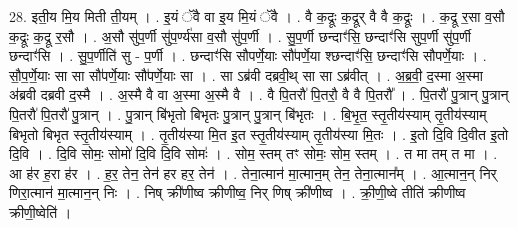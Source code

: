 \documentclass[17pt]{extarticle}
\begin{document}
28. इती॒य मि॒य मिती ती॒यम् । . इ॒यं ॅवै वा इ॒य मि॒यं ॅवै । . वै क॒द्रूः क॒द्रूर् वै वै क॒द्रूः । . क॒द्रू र॒सा व॒सौ क॒द्रूः क॒द्रू र॒सौ । . अ॒सौ सु॑प॒र्णी सु॑प॒र्ण्य॑सा व॒सौ सु॑प॒र्णी । . सु॒प॒र्णी छन्दाꣳ॑सि॒ छन्दाꣳ॑सि सुप॒र्णी सु॑प॒र्णी छन्दाꣳ॑सि । . सु॒प॒र्णीति॑ सु - प॒र्णी । . छन्दाꣳ॑सि सौपर्णे॒याः सौ॑पर्णे॒या श्छन्दाꣳ॑सि॒ छन्दाꣳ॑सि सौपर्णे॒याः । . सौ॒प॒र्णे॒याः सा सा सौ॑पर्णे॒याः सौ॑पर्णे॒याः सा । . सा ऽब्र॑वी दब्रवी॒थ् सा सा ऽब्र॑वीत् । . अ॒ब्र॒वी॒ द॒स्मा अ॒स्मा अ॑ब्रवी दब्रवी द॒स्मै । . अ॒स्मै वै वा अ॒स्मा अ॒स्मै वै । . वै पि॒तरौ॑ पि॒तरौ॒ वै वै पि॒तरौ᳚ । . पि॒तरौ॑ पु॒त्रान् पु॒त्रान् पि॒तरौ॑ पि॒तरौ॑ पु॒त्रान् । . पु॒त्रान् बि॑भृतो बिभृतः पु॒त्रान् पु॒त्रान् बि॑भृतः । . बि॒भृ॒त॒ स्तृ॒तीय॑स्याम् तृ॒तीय॑स्याम् बिभृतो बिभृत स्तृ॒तीय॑स्याम् । . तृ॒तीय॑स्या मि॒त इ॒त स्तृ॒तीय॑स्याम् तृ॒तीय॑स्या मि॒तः । . इ॒तो दि॒वि दि॒वीत इ॒तो दि॒वि । . दि॒वि सोमः॒ सोमो॑ दि॒वि दि॒वि सोमः॑ । . सोम॒ स्तम् तꣳ सोमः॒ सोम॒ स्तम् । . त मा तम् त मा । . आ ह॑र ह॒रा ह॑र । . ह॒र॒ तेन॒ तेन॑ हर हर॒ तेन॑ । . तेना॒त्मान॑ मा॒त्मान॒म् तेन॒ तेना॒त्मान᳚म् । . आ॒त्मान॒न् निर् णिरा॒त्मान॑ मा॒त्मान॒न् निः । . निष् क्री॑णीष्व क्रीणीष्व॒ निर् णिष् क्री॑णीष्व । . क्री॒णी॒ष्वे तीति॑ क्रीणीष्व क्रीणी॒ष्वेति॑ । \newline
\end{document}
